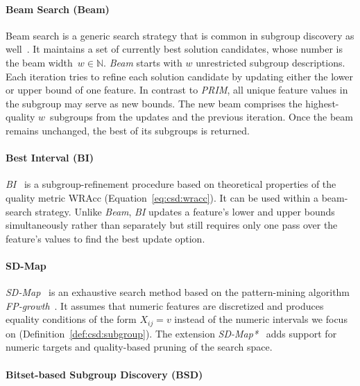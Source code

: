 \documentclass[acmsmall]{acmart} %
\theoremstyle{acmplain}
\theoremstyle{acmdefinition}
\begin{document}
\paragraph{Beam Search (Beam)}

Beam search is a generic search strategy that is common in subgroup discovery as well~\cite{atzmueller2015subgroup}.
It maintains a set of currently best solution candidates, whose number is the beam width~$w \in \mathbb{N}$.
\emph{Beam} starts with $w$ unrestricted subgroup descriptions.
Each iteration tries to refine each solution candidate by updating either the lower or upper bound of one feature.
In contrast to \emph{PRIM}, all unique feature values in the subgroup may serve as new bounds.
The new beam comprises the highest-quality $w$~subgroups from the updates and the previous iteration.
Once the beam remains unchanged, the best of its subgroups is returned.

\paragraph{Best Interval (BI)}

\emph{BI}~\cite{mampaey2012efficient} is a subgroup-refinement procedure based on theoretical properties of the quality metric WRAcc (Equation~\ref{eq:csd:wracc}).
It can be used within a beam-search strategy.
Unlike \emph{Beam}, \emph{BI} updates a feature's lower and upper bounds simultaneously rather than separately but still requires only one pass over the feature's values to find the best update option.

\paragraph{SD-Map}

\emph{SD-Map}~\cite{atzmueller2006sd} is an exhaustive search method based on the pattern-mining algorithm \emph{FP-growth}~\cite{han2000mining}.
It assumes that numeric features are discretized and produces equality conditions of the form $X_{ij} = v$ instead of the numeric intervals we focus on (Definition~\ref{def:csd:subgroup}).
The extension \emph{SD-Map*}~\cite{atzmueller2009fast} adds support for numeric targets and quality-based pruning of the search space.

\paragraph{Bitset-based Subgroup Discovery (BSD)}
\end{document}
